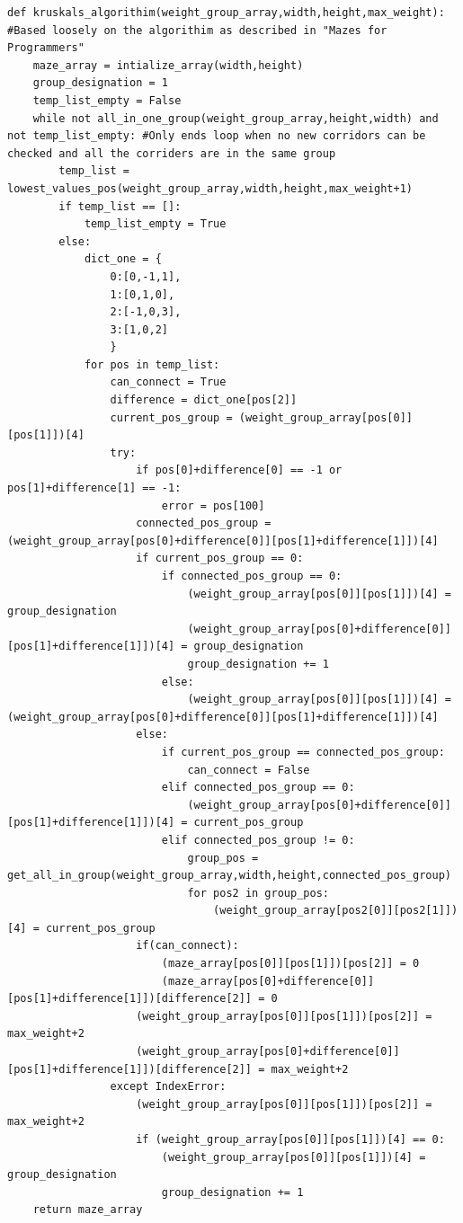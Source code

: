 \documentclass{article}
\begin{document}
\begin{lstlisting}
def kruskals_algorithim(weight_group_array,width,height,max_weight): #Based loosely on the algorithim as described in "Mazes for Programmers"
    maze_array = intialize_array(width,height)
    group_designation = 1                                                                                                                                           
    temp_list_empty = False
    while not all_in_one_group(weight_group_array,height,width) and not temp_list_empty: #Only ends loop when no new corridors can be checked and all the corriders are in the same group
        temp_list = lowest_values_pos(weight_group_array,width,height,max_weight+1)
        if temp_list == []:
            temp_list_empty = True
        else:
            dict_one = {
                0:[0,-1,1],
                1:[0,1,0],
                2:[-1,0,3],
                3:[1,0,2]
                }
            for pos in temp_list:
                can_connect = True
                difference = dict_one[pos[2]]
                current_pos_group = (weight_group_array[pos[0]][pos[1]])[4]                
                try:
                    if pos[0]+difference[0] == -1 or pos[1]+difference[1] == -1:
                        error = pos[100]
                    connected_pos_group = (weight_group_array[pos[0]+difference[0]][pos[1]+difference[1]])[4]
                    if current_pos_group == 0:
                        if connected_pos_group == 0:
                            (weight_group_array[pos[0]][pos[1]])[4] = group_designation
                            (weight_group_array[pos[0]+difference[0]][pos[1]+difference[1]])[4] = group_designation
                            group_designation += 1
                        else:
                            (weight_group_array[pos[0]][pos[1]])[4] = (weight_group_array[pos[0]+difference[0]][pos[1]+difference[1]])[4]
                    else:
                        if current_pos_group == connected_pos_group:
                            can_connect = False
                        elif connected_pos_group == 0:
                            (weight_group_array[pos[0]+difference[0]][pos[1]+difference[1]])[4] = current_pos_group
                        elif connected_pos_group != 0:
                            group_pos = get_all_in_group(weight_group_array,width,height,connected_pos_group)
                            for pos2 in group_pos:
                                (weight_group_array[pos2[0]][pos2[1]])[4] = current_pos_group
                    if(can_connect):
                        (maze_array[pos[0]][pos[1]])[pos[2]] = 0
                        (maze_array[pos[0]+difference[0]][pos[1]+difference[1]])[difference[2]] = 0
                    (weight_group_array[pos[0]][pos[1]])[pos[2]] = max_weight+2
                    (weight_group_array[pos[0]+difference[0]][pos[1]+difference[1]])[difference[2]] = max_weight+2
                except IndexError:
                    (weight_group_array[pos[0]][pos[1]])[pos[2]] = max_weight+2
                    if (weight_group_array[pos[0]][pos[1]])[4] == 0:
                        (weight_group_array[pos[0]][pos[1]])[4] = group_designation
                        group_designation += 1
    return maze_array


\end{lstlisting}
\end{document}
